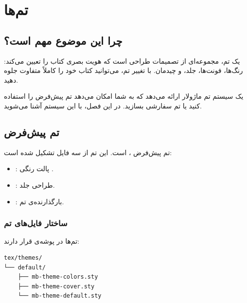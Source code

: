 
\chapter{تم‌ها}
\label{chap:themes}

\section{چرا این موضوع مهم است؟}
\label{sec:themes-why}

یک تم، مجموعه‌ای از تصمیمات طراحی است که
هویت بصری کتاب را تعیین می‌کند: رنگ‌ها،
فونت‌ها، جلد، و چیدمان. با تغییر تم،
می‌توانید کتاب خود را کاملاً متفاوت جلوه
دهید.

 یک سیستم تم ماژولار ارائه
می‌دهد که به شما امکان می‌دهد تم پیش‌فرض را
استفاده کنید یا تم سفارشی بسازید. در این
فصل، با این سیستم آشنا می‌شوید.


\section{تم پیش‌فرض}
\label{sec:themes-default}

تم پیش‌فرض ،  است.
این تم از سه فایل تشکیل شده است:

\begin{itemize}
    \item {}: پالت
    رنگی .
    \item {}: طراحی
    جلد.
    \item {}:
    بارگذارنده‌ی تم.
\end{itemize}


\subsection{ساختار فایل‌های تم}
\label{sec:themes-structure}

تم‌ها در پوشه‌ی  قرار
دارند:

\begin{latin}
\begin{verbatim}
tex/themes/
└── default/
    ├── mb-theme-colors.sty
    ├── mb-theme-cover.sty
    └── mb-theme-default.sty
\end{verbatim}
\end{latin}

